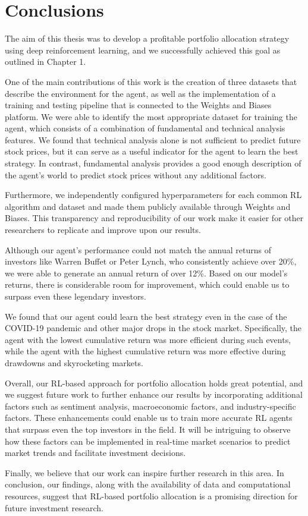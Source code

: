 \documentclass[../xlapes02]{subfiles}
\begin{document}
    \chapter{Conclusions}\label{ch:conclusions}
    The aim of this thesis was to develop a profitable portfolio allocation strategy using deep reinforcement learning, and we successfully achieved this goal as outlined in Chapter 1.

    One of the main contributions of this work is the creation of three datasets that describe the environment for the agent, as well as the implementation of a training and testing pipeline that is connected to the Weights and Biases platform. We were able to identify the most appropriate dataset for training the agent, which consists of a combination of fundamental and technical analysis features. We found that technical analysis alone is not sufficient to predict future stock prices, but it can serve as a useful indicator for the agent to learn the best strategy. In contrast, fundamental analysis provides a good enough description of the agent's world to predict stock prices without any additional factors.

    Furthermore, we independently configured hyperparameters for each common RL algorithm and dataset and made them publicly available through Weights and Biases. This transparency and reproducibility of our work make it easier for other researchers to replicate and improve upon our results.

    Although our agent's performance could not match the annual returns of investors like Warren Buffet or Peter Lynch, who consistently achieve over 20\%, we were able to generate an annual return of over 12\%. Based on our model's returns, there is considerable room for improvement, which could enable us to surpass even these legendary investors.

    We found that our agent could learn the best strategy even in the case of the COVID-19 pandemic and other major drops in the stock market. Specifically, the agent with the lowest cumulative return was more efficient during such events, while the agent with the highest cumulative return was more effective during drawdowns and skyrocketing markets.

    Overall, our RL-based approach for portfolio allocation holds great potential, and we suggest future work to further enhance our results by incorporating additional factors such as sentiment analysis, macroeconomic factors, and industry-specific factors. These enhancements could enable us to train more accurate RL agents that surpass even the top investors in the field. It will be intriguing to observe how these factors can be implemented in real-time market scenarios to predict market trends and facilitate investment decisions.

    Finally, we believe that our work can inspire further research in this area. In conclusion, our findings, along with the availability of data and computational resources, suggest that RL-based portfolio allocation is a promising direction for future investment research.
\end{document}
